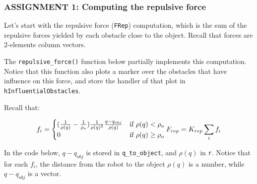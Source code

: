 \documentclass[11pt]{article}
\begin{document}
    \hypertarget{assignment-1-computing-the-repulsive-force}{%
\subsubsection{\texorpdfstring{\textbf{{ASSIGNMENT 1: Computing the
repulsive
force}}}{ASSIGNMENT 1: Computing the repulsive force}}\label{assignment-1-computing-the-repulsive-force}}

Let's start with the repulsive force (\texttt{FRep}) computation, which
is the sum of the repulsive forces yielded by each obstacle close to the
object. Recall that forces are 2-elements column vectors.

The \texttt{repulsive\_force()} function below partially implements this
computation. Notice that this function also plots a marker over the
obstacles that have influence on this force, and store the handler of
that plot in \texttt{hInfluentialObstacles}.

Recall that:

\[
f_i=  \begin{cases} 
   (\frac{1}{\rho(q)}-\frac{1}{\rho_o}) \frac{1}{\rho(q)^2} \frac{q-q_{obj}}{\rho(q)} & \text{if } \rho(q) < \rho_o \\
   0       & \text{if } \rho(q) \geq \rho_o
  \end{cases}
  \\
F_{rep} = K_{rep} \sum_i f_i  
\]

In the code below, \(q-q_{obj}\) is stored in \texttt{q\_to\_object},
and \(\rho(q)\) in \texttt{r}. Notice that for each \(f_i\), the
distance from the robot to the object \(\rho(q)\) is a number, while
\(q-q_{obj}\) is a vector.
\end{document}
